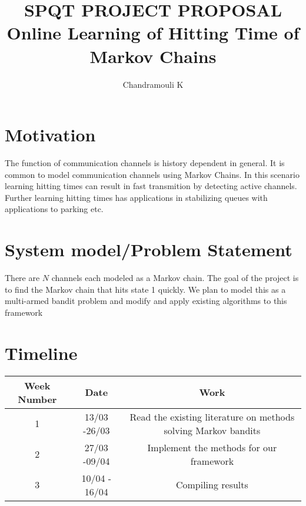 \documentclass[a4paper,10pt,english]{article}
\title{\textbf{SPQT PROJECT PROPOSAL}\\ Online Learning of Hitting Time of Markov Chains}
\author{Chandramouli K}
\begin{document}
\maketitle
\section{Motivation}
\par The function of communication channels is history dependent in general.
It is common to model communication channels using Markov Chains. In this scenario learning
hitting times can result in fast transmition by detecting active channels.
Further learning hitting times has applications in stabilizing queues with applications to 
parking etc. 

\section{System model/Problem Statement}
There are $N$ channels each modeled as a Markov chain. 
The goal of the project is to find the Markov chain that hits state 1 quickly. 
We plan to model this as a multi-armed bandit problem and modify and apply existing algorithms to
this framework
\section{Timeline}
\begin{center}
\begin{tabular}{|c|c|c|}
\hline
Week Number & Date & Work \\ \hline
1 & 13/03 -26/03 & Read the existing literature on methods solving Markov bandits  \\ \hline
2 & 27/03 -09/04 & Implement the methods for our framework \\ \hline
3 & 10/04 - 16/04 & Compiling results \\ \hline
\end{tabular}
\end{center}
\end{document}

